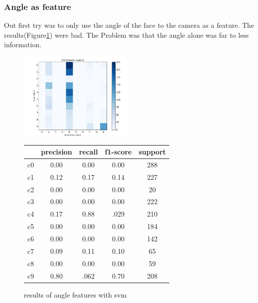 \documentclass[10pt,twocolumn,letterpaper]{article}
\begin{document}
	\subsubsection{Angle as feature}
	Out first try was to only use the angle of the face to the camera as a feature. The results(Figure\ref{headpose_feature}) were bad. The Problem was that the angle alone was far to less information.
	\begin{figure}[h]
	\centering
	\includegraphics[width=0.5\textwidth]{angle_only}\hspace{0.01\textwidth}
	\begin{tabular}{c||c|c|c|c}
	  & precision&recall&f1-score&support\\	\hline
	 c0&0.00&0.00&0.00&288\\
	 c1&0.12&0.17&0.14&227\\
	 c2&0.00&0.00&0.00&20\\
	 c3&0.00&0.00&0.00&222\\
	 c4&0.17&0.88&.029&210\\
	 c5&0.00&0.00&0.00&184\\
	 c6&0.00&0.00&0.00&142\\
	 c7&0.09&0.11&0.10&65\\
	 c8&0.00&0.00&0.00&59\\
	 c9&0.80&.062&0.70&208
	\end{tabular}
	\caption{results of angle features with svm}
	\label{headpose_feature}
	\end{figure}
\end{document}
